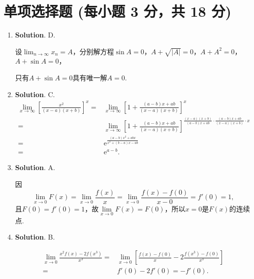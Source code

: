 \documentclass[../main.tex]{subfiles}
\begin{document}
\section{单项选择题 (每小题 3 分，共 18 分)}
\begin{enumerate}
    \item \textbf{Solution}. D.

          设$\lim_{n\to\infty}x_{n}=A$，分别解方程$\sin A=0$，$A+\sqrt{|A|}=0$，$A+A^{2}
              =0$，$A+\sin A=0$，

          只有$A+\sin A=0$具有唯一解$A=0$.

    \item \textbf{Solution}. C.
          \[
              \begin{aligned}
                  \lim_{x\to\infty}\left[\frac{x^2}{(x-a)(x+b)}\right]^{x}= {} & \lim_{x\to\infty}\left[1+\frac{(a-b)x+ab}{(x-a)(x+b)}\right]^{x}                                                                    \\
                  = {}                                                         & \lim_{x\to\infty}\left[1+\frac{(a-b)x+ab}{(x-a)(x+b)}\right]^{\frac{(x-a)(x+b)}{(a-b)x+ab}\cdot\frac{(a-b)x+ab}{(x-a)(x+b)}\cdot x} \\
                  = {}                                                         & \mathrm{e}^{\frac{(a-b)x^2+abx}{x^2+(b-a)x-ab}}                                                                                     \\
                  = {}                                                         & \mathrm{e}^{a-b}.
              \end{aligned}
          \]

    \item \textbf{Solution}. A.

          因
          \[
              \lim_{x\to0}F(x)=\lim_{x\to0}\frac{f(x)}{x}=\lim_{x\to0}\frac{f(x)-f(0)}{x-0}
              =f'(0)=1,
          \]
          且$F(0)=f'(0)=1$，故$\lim\limits_{x\to0}F(x)=F(0)$，所以$x=0$是$F(x)$的连续点.

    \item \textbf{Solution}. B.

          \[
              \begin{aligned}
                  \lim_{x\to0}\frac{x^2f(x)-2f(x^3)}{x^3}= {} & \lim_{x\to0}\left[\frac{f(x)-f(0)}{x}-2\frac{f(x^3)-f(0)}{x^3}\right] \\
                  = {}                                        & f'(0)-2f'(0)=-f'(0).
              \end{aligned}
          \]


\end{enumerate}
\end{document}
